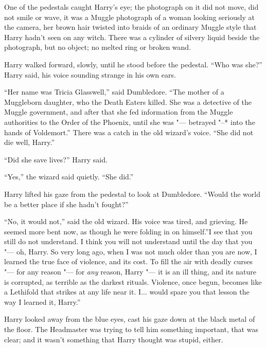 One of the pedestals caught Harry's eye; the photograph on it did not
move, did not smile or wave, it was a Muggle photograph of a woman
looking seriously at the camera, her brown hair twisted into braids of
an ordinary Muggle style that Harry hadn't seen on any witch. There was
a cylinder of silvery liquid beside the photograph, but no object; no
melted ring or broken wand.

Harry walked forward, slowly, until he stood before the pedestal. ``Who
was she?'' Harry said, his voice sounding strange in his own ears.

``Her name was Tricia Glasswell,'' said Dumbledore. ``The mother of a
Muggleborn daughter, who the Death Eaters killed. She was a detective of
the Muggle government, and after that she fed information from the
Muggle authorities to the Order of the Phoenix, until she was "--- betrayed
"--* into the hands of Voldemort.'' There was a catch in the old wizard's
voice. ``She did not die well, Harry.''

``Did she save lives?'' Harry said.

``Yes,'' the wizard said quietly. ``She did.''

Harry lifted his gaze from the pedestal to look at Dumbledore. ``Would
the world be a better place if she hadn't fought?''

``No, it would not,'' said the old wizard. His voice was tired, and
grieving. He seemed more bent now, as though he were folding in on
himself.''I see that you still do not understand. I think you will not
understand until the day that you "--- oh, Harry. So very long ago, when I
was not much older than you are now, I learned the true face of
violence, and its cost. To fill the air with deadly curses "--- for any
reason "--- for \emph{any} reason, Harry "--- it is an ill thing, and its
nature is corrupted, as terrible as the darkest rituals. Violence, once
begun, becomes like a Lethifold that strikes at any life near it.
I... would spare you that lesson the way I learned it, Harry.''

Harry looked away from the blue eyes, cast his gaze down at the black
metal of the floor. The Headmaster was trying to tell him something
important, that was clear; and it wasn't something that Harry thought
was stupid, either.

